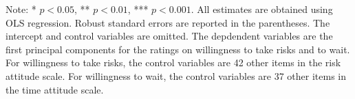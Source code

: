 \documentclass[12pt]{article}
\begin{document}
\begin{table}
    \vspace*{4pt}
    \centering
    \begin{minipage}{0.85\textwidth}
    {\par\footnotesize Note: * $p<0.05$, ** $p<0.01$, *** $p<0.001$. All estimates are obtained using OLS regression. Robust standard errors are reported in the parentheses. The intercept and control variables are omitted. The depdendent variables are the first principal components for the ratings on willingness to take risks and to wait. For willingness to take risks, the control variables are 42 other items in the risk attitude scale. For willingness to wait, the control variables are 37 other items in the time attitude scale.}
    \end{minipage}
    \label{tab:psm}
\end{table}
\end{document}
